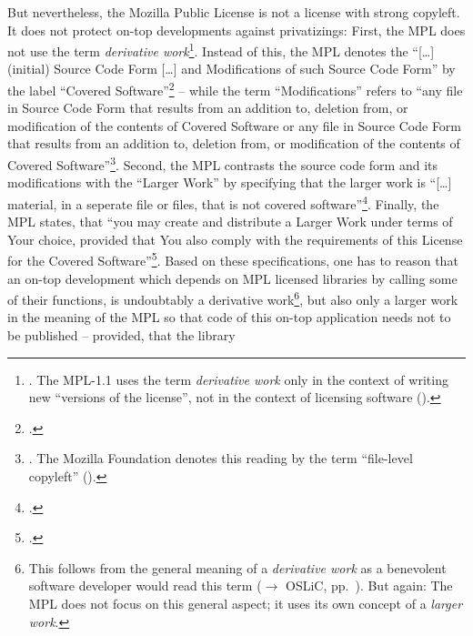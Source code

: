 But nevertheless, the Mozilla Public License is not a license with strong
copyleft. It does not protect on-top developments against privatizings: First,
the MPL does not use the term \emph{derivative work}\footnote{
\cite[cf.][\nopage wp]{Mpl20OsiLicense2013a}. The MPL-1.1 uses the term
\emph{derivative work} only in the context of writing new \enquote{versions of
the license}, not in the context of licensing software (\cite[cf.][\nopage wp
§6.3]{Mpl11MozFoundation2013a}).}. Instead of this, the MPL denotes the
\enquote{[\ldots] (initial) Source Code Form [\ldots] and Modifications of such
Source Code Form} by the label \enquote{Covered Software}\footcite[cf.][\nopage
wp\ §1.4]{Mpl20OsiLicense2013a} -- while the term \enquote{Modifications}
refers to \enquote{any file in Source Code Form that results from an addition
to, deletion from, or modification of the contents of Covered Software or any
file in Source Code Form that results from an addition to, deletion from, or
modification of the contents of Covered Software}\footnote{\cite[cf.][\nopage
wp\ §1.10]{Mpl20OsiLicense2013a}. The Mozilla Foundation denotes this reading
by the term \enquote{file-level copyleft} (\cite[cf.][\nopage
wp]{Mpl11To20MozFoundation2013a}).}. Second, the MPL contrasts the source code
form and its modifications with the \enquote{Larger Work} by specifying that the
larger work is \enquote{[\ldots] material, in a seperate file or files, that is
not covered software}\footcite[cf.][\nopage wp\ §1.7]{Mpl20OsiLicense2013a}.
Finally, the MPL states, that \enquote{you may create and distribute a Larger
Work under terms of Your choice, provided that You also comply with the
requirements of this License for the Covered Software}\footcite[cf.][\nopage
wp\ §3.3]{Mpl20OsiLicense2013a}. Based on these specifications, one has to
reason that an on-top development which depends on MPL licensed libraries by
calling some of their functions, is undoubtably a derivative work\footnote{This
follows from the general meaning of a \emph{derivative work} as a benevolent
software developer would read this term ($\rightarrow$ OSLiC, pp.\
\pageref{sec:BenevolentDerivativeWorkUnderstanding}). But again: The MPL does
not focus on this general aspect; it uses its own concept of a \emph{larger
work}.}, but also only a larger work in the meaning of the MPL so that code of
this on-top application needs not to be published -- provided, that the library
